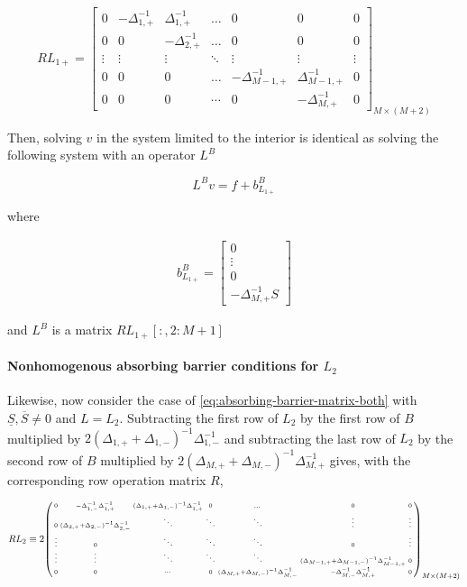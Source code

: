 \documentclass[11pt]{article}
\newenvironment{psmallmatrix}
{\left(\begin{smallmatrix}}
	{\end{smallmatrix}\right)}
\theoremstyle{definition}
\begin{document}
\begin{equation}
R {L}_{1+} = \begin{bmatrix}
0&-\Delta_{1,+}^{-1}&\Delta_{1,+}^{-1}&\dots&0&0&0\\
0&0&-\Delta_{2,+}^{-1}&\dots&0&0&0\\
\vdots&\vdots&\vdots&\ddots&\vdots&\vdots&\vdots\\
0&0&0&\dots&-\Delta_{M-1,+}^{-1}&\Delta_{M-1,+}^{-1}&0\\
0&0&0&\cdots&0&-\Delta_{M,+}^{-1}&0
\end{bmatrix}_{M\times (M+2)} 
\end{equation}

Then, solving $v$ in the system limited to the interior is identical as solving the following system with an operator $L^B$ 

\begin{equation}
L^Bv= f + b_{L_{1+}}^B
\end{equation}

where 

\begin{align}
b_{L_{1+}}^B = \begin{bmatrix}
0 \\ \vdots \\ 0 \\
-\Delta_{M,+}^{-1} S
\end{bmatrix}
\end{align}

and $L^B$ is a matrix $RL_{1+}[:,2:M+1]$
\paragraph{Nonhomogenous absorbing barrier conditions for $L_{2}$} Likewise, now consider the case of \cref{eq:absorbing-barrier-matrix-both} with $\underline{S}, \overline{S} \neq 0$ and $L = L_{2}$. Subtracting the first row of $L_{2}$ by the first row of $B$ multiplied by $2(\Delta_{1,+} + \Delta_{1,-})^{-1} \Delta_{1,-}^{-1} $ and subtracting the last row of $L_{2}$ by the second row of $B$ multiplied by $ 2 (\Delta_{M,+} + \Delta_{M,-})^{-1} \Delta_{M,+}^{-1}$ gives, with the corresponding row operation matrix $R$, 

\begin{align}
 \small
R {L}_2 \equiv 2 \begin{psmallmatrix}
0 &
-\Delta_{1,-}^{-1} \Delta_{1,+}^{-1}  & (\Delta_{1,+}+\Delta_{1,-})^{-1} \Delta_{1,+}^{-1}&0&\dots&0 & 0\\
0 & (\Delta_{2,+}+\Delta_{2,-})^{-1}\Delta_{2,-}^{-1}  & \ddots &\ddots & \ddots& \vdots & \vdots  \\
\vdots& 0 & \ddots & \ddots & \ddots & 0  & \vdots  \\
\vdots& \vdots &\ddots & \ddots & \ddots& (\Delta_{M-1,+}+\Delta_{M-1,-})^{-1}\Delta_{M-1,+}^{-1} & 0\\
0& 0&\cdots& 0 &
(\Delta_{M,+}+\Delta_{M,-})^{-1}\Delta_{M,-}^{-1} &-\Delta_{M,-}^{-1} \Delta_{M,+}^{-1} &0   
\end{psmallmatrix}_{M\times (M+2)} 
\end{align}
\end{document}
